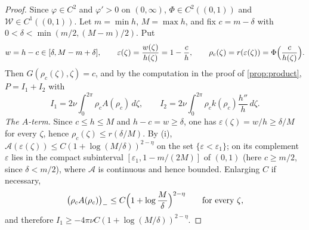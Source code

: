 \documentclass[11pt]{article}
\theoremstyle{definition}
\begin{document}
\begin{proof}
Since $\varphi\in C^2$ and $\varphi'>0$ on $(0,\infty)$, $\Phi\in C^2((0,1))$
and $\mathcal W\in C^1((0,1))$. Let $m=\min h$, $M=\max h$, and fix
$c=m-\delta$ with $0<\delta<\min(m/2,(M-m)/2)$. Put
\begin{equation}
w=h-c\in[\delta,M-m+\delta],\qquad
\varepsilon(\zeta)=\frac{w(\zeta)}{h(\zeta)}=1-\frac ch,\qquad
\rho_c(\zeta)=r(\varepsilon(\zeta))=\Phi\Bigl(\frac{c}{h(\zeta)}\Bigr).
\end{equation}
Then $G(\rho_c(\zeta),\zeta)=c$, and by the computation in the proof of
\cref{prop:product}, $P=I_1+I_2$ with
\begin{equation}
I_1=2\nu\int_0^{2\pi}\rho_cA(\rho_c)\,d\zeta,\qquad
I_2=2\nu\int_0^{2\pi}\rho_ck(\rho_c)\frac{h''}{h}\,d\zeta .
\end{equation}
\emph{The $A$-term.}  Since $c\le h\le M$ and $h-c=w\ge\delta$, one has
$\varepsilon(\zeta)=w/h\ge\delta/M$ for every $\zeta$, hence
$\rho_c(\zeta)\le r(\delta/M)$.  By (i),
$\mathcal A(\varepsilon(\zeta))\le C(1+\log(M/\delta))^{2-\eta}$ on the set
$\{\varepsilon<\varepsilon_1\}$; on its complement $\varepsilon$ lies in the
compact subinterval $[\varepsilon_1,1-m/(2M)]$ of $(0,1)$ (here $c\ge m/2$,
since $\delta<m/2$), where $\mathcal A$ is continuous and hence bounded.
Enlarging $C$ if necessary,
\begin{equation}
\bigl(\rho_cA(\rho_c)\bigr)_-\le C\Bigl(1+\log\frac M\delta\Bigr)^{2-\eta}
\qquad\text{for every }\zeta,
\end{equation}
and therefore $I_1\ge-4\pi\nu C(1+\log(M/\delta))^{2-\eta}$.


\end{proof}
\end{document}

